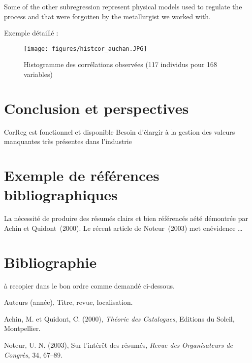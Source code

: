\documentclass[12pt]{article}
\begin{document}
			Some of the other subregression represent physical models used to regulate the process and that were forgotten by the metallurgist we worked with.

Exemple détaillé :

		\begin{figure}	
		\centering		
			\texttt{[image: figures/histcor\_auchan.JPG]} 
			\caption{Histogramme des corrélations observées (117 individus pour 168 variables)}
		\end{figure}

\section{Conclusion et perspectives}
	CorReg est fonctionnel et disponible
	Besoin d'élargir à la gestion des valeurs manquantes très présentes dans l'industrie
\section{Exemple de références bibliographiques}
La nécessité de produire des résumés clairs et bien
référencés aété démontrée par Achin et Quidont~(2000). Le
récent article de Noteur~(2003) met enévidence \dots

\section*{Bibliographie}
{}

à recopier dans le bon ordre comme demandé ci-dessous.

\noindent [1] Auteurs (année), Titre, revue, localisation.

\noindent [2] Achin, M. et Quidont, C. (2000), {\it Théorie des
Catalogues}, Editions du Soleil, Montpellier.

\noindent [3] Noteur, U. N. (2003), Sur l'intér\^et des
résumés, {\it Revue des Organisateurs de Congrès}, 34, 67--89.
\end{document}
